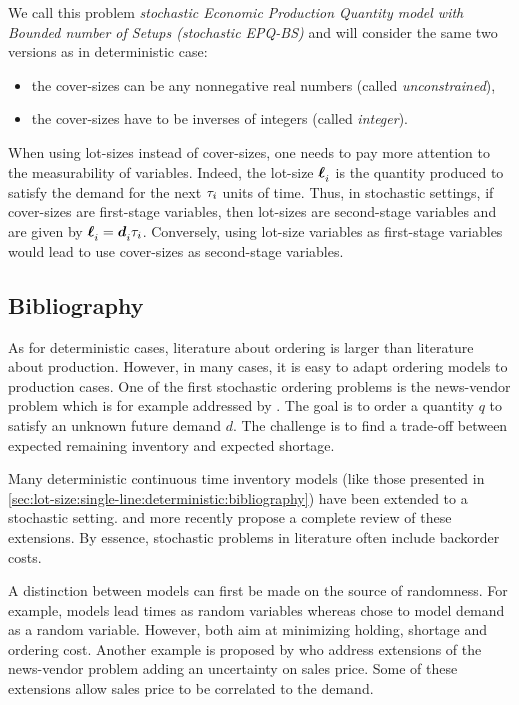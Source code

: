 We call this problem \emph{stochastic Economic Production Quantity model with Bounded number of Setups (stochastic EPQ-BS)} and will consider the same two versions as in deterministic case:
\begin{itemize}
  \item the cover-sizes can be any nonnegative real numbers (called \emph{unconstrained}),
  \item the cover-sizes have to be inverses of integers (called \emph{integer}).
\end{itemize}


When using lot-sizes instead of cover-sizes, one needs to pay more attention to the measurability of variables.
Indeed, the lot-size $\va\lot_i$ is the quantity produced to satisfy the demand for the next $\tau_i$ units of time.
Thus, in stochastic settings, if cover-sizes are first-stage variables, then lot-sizes are second-stage variables and are given by $\va\lot_i=\va\demand_i\cover_i$.
Conversely, using lot-size variables as first-stage variables would lead to use cover-sizes as second-stage variables.


\subsection{Bibliography}
\label{sec:lot-size:single-line:stochastic:bibliography}


As for deterministic cases, literature about ordering is larger than literature about production.
However, in many cases, it is easy to adapt ordering models to production cases.
One of the first stochastic ordering problems is the news-vendor problem which is for example addressed by \citet{Edgeworth88}.
The goal is to order a quantity $q$ to satisfy an unknown future demand $d$.
The challenge is to find a trade-off between expected remaining inventory and expected shortage.


Many deterministic continuous time inventory models (like those presented in \cref{sec:lot-size:single-line:deterministic:bibliography}) have been extended to a stochastic setting.
\citet{Candace1995} and more recently \citet{Ziukov2015} propose a complete review of these extensions.
By essence, stochastic problems in literature often include backorder costs.


\medskip


A distinction between models can first be made on the source of randomness.
For example, \citet{Friedman1984} models lead times as random variables whereas \citet{Eynan2007} chose to model demand as a random variable.
However, both aim at minimizing holding, shortage and ordering cost.
Another example is proposed by \citet{Sana2011} who address extensions of the news-vendor problem adding an uncertainty on sales price.
Some of these extensions allow sales price to be correlated to the demand.


